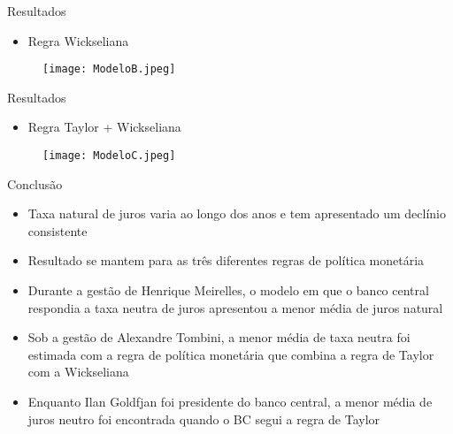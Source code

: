 \documentclass[9pt]{beamer}
\let\olditem\item
\renewcommand{\item}{%
\olditem\vspace{\fill}}
\begin{document}
\begin{frame}{Resultados}
\begin{itemize}
    \item Regra Wickseliana
\end{itemize}
\begin{figure}[H]
\centering
\texttt{[image: ModeloB.jpeg]}
\end{figure}

\end{frame}
\begin{frame}{Resultados}
\begin{itemize}
    \item Regra Taylor + Wickseliana
\end{itemize}
\begin{figure}[H]
\centering
\texttt{[image: ModeloC.jpeg]}
\end{figure}

\end{frame}
\begin{frame}{Conclusão}
\begin{itemize}
    \item Taxa natural de juros varia ao longo dos anos e tem apresentado um declínio consistente
    
    \item Resultado se mantem para as três diferentes regras de política monetária
    
    \item Durante a gestão de Henrique Meirelles, o modelo em que o banco central respondia a taxa neutra de juros apresentou a menor média de juros natural 
    
    \item Sob a gestão de Alexandre Tombini, a menor média de taxa neutra foi estimada com a regra de política monetária que combina a regra de Taylor com a Wickseliana 
    
    \item Enquanto Ilan Goldfjan foi presidente do banco central, a menor média de juros neutro foi encontrada quando o BC segui a regra de Taylor
    
\end{itemize}


\end{frame}

%
%
\end{document}
